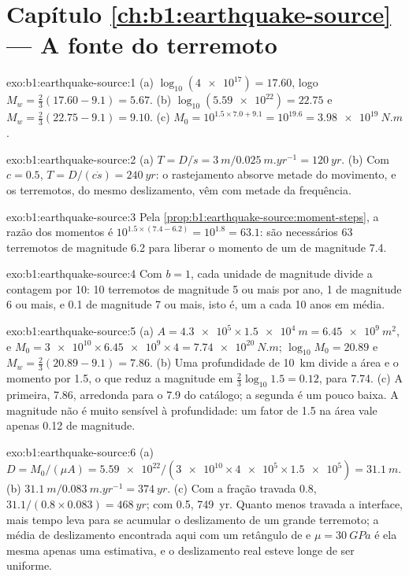 \section*{Capítulo \ref{ch:b1:earthquake-source} --- A fonte do terremoto}

\begin{solution}{exo:b1:earthquake-source:1}
(a) $\log_{10}(\num{4e17}) = 17.60$, logo $M_w = \tfrac23(17.60 - 9.1) = 5.67$.
(b) $\log_{10}(\num{5.59e22}) = 22.75$ e $M_w = \tfrac23(22.75 - 9.1) =
9.10$. (c) $M_0 = 10^{1.5\times7.0 + 9.1} = 10^{19.6} = \qty{3.98e19}{N.m}$.
\end{solution}

\begin{solution}{exo:b1:earthquake-source:2}
(a) $T = D/\dot s = \qty{3}{m}/\qty{0.025}{m.yr^{-1}} = \qty{120}{yr}$.
(b) Com $c = 0.5$, $T = D/(c\dot s) = \qty{240}{yr}$: o rastejamento absorve metade
do movimento, e os terremotos, do mesmo deslizamento, vêm com metade da frequência.
\end{solution}

\begin{solution}{exo:b1:earthquake-source:3}
Pela \cref{prop:b1:earthquake-source:moment-steps}, a razão dos momentos é
$10^{1.5\times(7.4 - 6.2)} = 10^{1.8} = 63.1$: são necessários 63 terremotos de magnitude 6.2 para liberar o momento de um de magnitude 7.4.
\end{solution}

\begin{solution}{exo:b1:earthquake-source:4}
Com $b = 1$, cada unidade de magnitude divide a contagem por 10: 10 terremotos de magnitude 5 ou mais por ano, 1 de magnitude 6 ou mais, e 0.1 de magnitude 7 ou mais, isto é, um a cada 10 anos em média.
\end{solution}

\begin{solution}{exo:b1:earthquake-source:5}
(a) $A = \num{4.3e5} \times \qty{1.5e4}{m} = \qty{6.45e9}{m^2}$, e
$M_0 = \num{3e10}\times\num{6.45e9}\times4 = \qty{7.74e20}{N.m}$;
$\log_{10}M_0 = 20.89$ e $M_w = \tfrac23(20.89 - 9.1) = 7.86$. (b) Uma profundidade de
\qty{10}{km} divide a área e o momento por 1.5, o que reduz a magnitude em
$\tfrac23\log_{10}1.5 = 0.12$, para 7.74. (c) A primeira, 7.86, arredonda para o 7.9 do catálogo; a segunda é um pouco baixa. A magnitude não é muito sensível à profundidade: um fator de 1.5 na área vale apenas 0.12 de magnitude.
\end{solution}

\begin{solution}{exo:b1:earthquake-source:6}
(a) $D = M_0/(\mu A) = \num{5.59e22}/(\num{3e10}\times\num{4e5}\times\num{1.5e5})
= \qty{31.1}{m}$. (b) $\qty{31.1}{m}/\qty{0.083}{m.yr^{-1}} = \qty{374}{yr}$.
(c) Com a fração travada 0.8, $31.1/(0.8\times0.083) = \qty{468}{yr}$; com
0.5, \qty{749}{yr}. Quanto menos travada a interface, mais tempo leva para se acumular o deslizamento de um grande terremoto; a média de deslizamento encontrada aqui com um retângulo de  e $\mu = \qty{30}{GPa}$ é ela mesma apenas uma estimativa, e o deslizamento real esteve longe de ser uniforme.
\end{solution}

